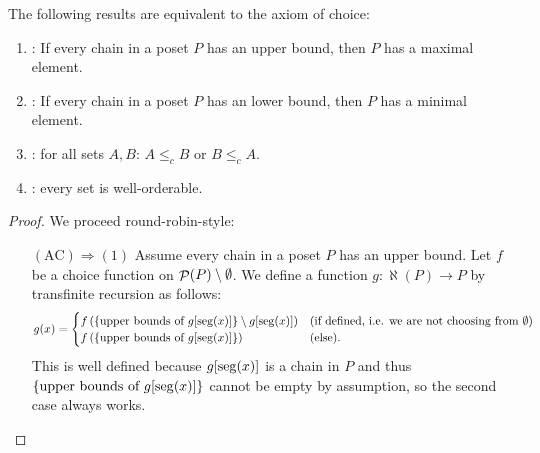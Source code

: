 \begin{theorem}
The following results are equivalent to the axiom of choice:
\begin{enumerate}
\item {}: If every chain in a poset $P$ has an upper bound, then $P$ has a maximal element.
\item {}: If every chain in a poset $P$ has an lower bound, then $P$ has a minimal element.
\item {}: for all sets $A,B$: $A\leq_c B$ or $B\leq_c A$.
\item {}: every set is well-orderable.
\end{enumerate}
\end{theorem}
\begin{proof}
We proceed round-robin-style:
\begin{itemize}[leftmargin=2cm]
\item[$\boxed{(\text{AC}) \Rightarrow (1)}$] Assume every chain in a poset $P$ has an upper bound. Let $f$ be a choice function on $\mathop{\mathcal{P}}(P)\setminus \emptyset$. We define a function $g: \aleph(P) \to P$ by transfinite recursion as follows:
\[ g(x) = \begin{cases}
f\left( \{\text{upper bounds of $g[\operatorname{seg}(x)]$}  \} \setminus g[\operatorname{seg}(x)] \right) & \text{(if defined, i.e. we are not choosing from $\emptyset$)} \\
f\left( \{\text{upper bounds of $g[\operatorname{seg}(x)]$}  \} \right) & (\text{else}).
\end{cases} \]
This is well defined because $g[\operatorname{seg}(x)]$ is a chain in $P$ and thus $\{\text{upper bounds of $g[\operatorname{seg}(x)]$}  \}$ cannot be empty by assumption, so the second case always works.


\end{itemize}
\end{proof}
